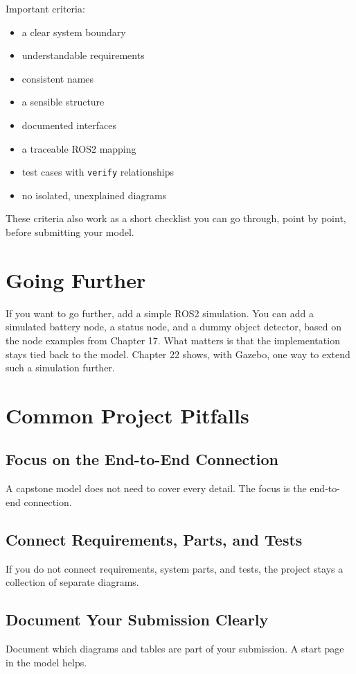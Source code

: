 Important criteria:

\begin{itemize}
    \item a clear system boundary
    \item understandable requirements
    \item consistent names
    \item a sensible structure
    \item documented interfaces
    \item a traceable ROS2 mapping
    \item test cases with \texttt{verify} relationships
    \item no isolated, unexplained diagrams
\end{itemize}

These criteria also work as a short checklist you can go through, point by point, before submitting your model.

\section{Going Further}
If you want to go further, add a simple ROS2 simulation. You can add a simulated battery node, a status node, and a dummy object detector, based on the node examples from Chapter 17. What matters is that the implementation stays tied back to the model. Chapter 22 shows, with Gazebo, one way to extend such a simulation further.

\section{Common Project Pitfalls}
\subsection{Focus on the End-to-End Connection}
A capstone model does not need to cover every detail. The focus is the end-to-end connection.

\subsection{Connect Requirements, Parts, and Tests}
If you do not connect requirements, system parts, and tests, the project stays a collection of separate diagrams.

\subsection{Document Your Submission Clearly}
Document which diagrams and tables are part of your submission. A start page in the model helps.

